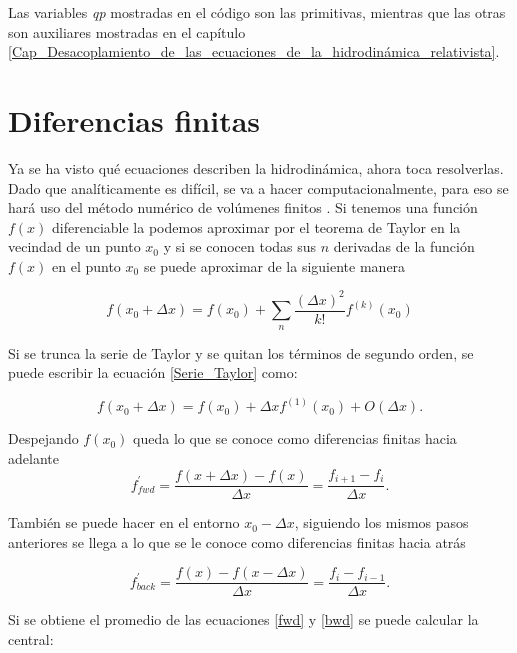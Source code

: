 \documentclass[12pt,a4paper]{book}
\begin{document}
Las variables \emph{qp} mostradas en el código son las primitivas, mientras que las otras son auxiliares mostradas en el capítulo 
\ref{Cap_Desacoplamiento_de_las_ecuaciones_de_la_hidrodinámica_relativista}.


\section{Diferencias finitas} \label{sec:Diferencias_finitas}
Ya se ha visto qué ecuaciones describen la hidrodinámica, ahora toca resolverlas. Dado que analíticamente es difícil, se va a hacer computacionalmente, para 
eso se hará uso del método numérico de volúmenes finitos \citep{Duran2021}.
Si tenemos una función $f(x)$ diferenciable la podemos aproximar por el teorema de Taylor en la vecindad de un punto $x_0$ y si se conocen todas sus $n$ derivadas de la función $f(x)$ en el punto $x_0$ se puede 
aproximar de la siguiente manera

\begin{equation}\label{Serie_Taylor}
f\left( x_0 + \Delta x\right) = f\left( x_0 \right)+
\sum_n \frac{\left( \Delta x \right) ^2}{k!}f^{(k)} \left(x_0
\right)
\end{equation}

Si se trunca la serie de Taylor y se quitan los términos de segundo orden, se puede escribir la ecuación \ref{Serie_Taylor} como:

\begin{equation}
f\left( x_0 + \Delta x \right) = f(x_0) + \Delta x f^{(1)} (x_0) + O \left( \Delta x \right).
\end{equation}

\noindent Despejando $f(x_0)$ queda lo que se conoce como diferencias finitas hacia adelante
\begin{equation}\label{fwd}
f_{fwd}^{'}=\frac{f\left(x + \Delta x \right) - f(x) }{\Delta x}=\frac{f_{i+1}-f_{i}}{\Delta x}.
\end{equation}

\noindent También se puede hacer en el entorno $x_0- \Delta x$, siguiendo los mismos pasos anteriores se llega a lo que se le conoce como diferencias finitas hacia atrás


\begin{equation}\label{bwd}
f_{back}^{'}=\frac{f\left(x \right) - f(x - \Delta x) }{\Delta x}=\frac{f_{i}-f_{i-1}}{\Delta x}.
\end{equation}

\noindent Si se obtiene el promedio de las ecuaciones \ref{fwd} y \ref{bwd} se puede calcular la central:
\end{document}
